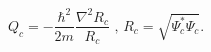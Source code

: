 \begin{equation}
Q_{c}=-\frac{\hbar^{2}}{2m}\frac{\nabla^{2}R_{c}}{R_{c}}\text{ \ ,\ \ \ }%
R_{c}=\sqrt{\Psi_{c}^{\ast}\Psi_{c}}.\label{18.6}%
\end{equation}

